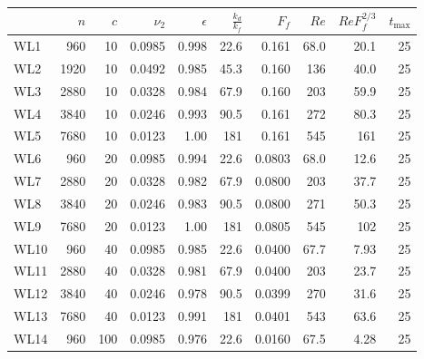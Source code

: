 \begin{table}
\begin{center}

\begin{tabular}{lrrrrrrrrr}
\toprule
{} &   $n$ &  $c$ &  $\nu_2$ &  $\epsilon$ &  $\frac{k_d}{k_f}$ &   $F_f$ &  $Re$ &  $ReF_f^{2/3}$ &  $t_{\max}$ \\
\midrule
WL1  &   960 &   10 &   0.0985 &       0.998 &                    22.6 &   0.161 &  68.0 &           20.1 &          25 \\
WL2  &  1920 &   10 &   0.0492 &       0.985 &                    45.3 &   0.160 &   136 &           40.0 &          25 \\
WL3  &  2880 &   10 &   0.0328 &       0.984 &                    67.9 &   0.160 &   203 &           59.9 &          25 \\
WL4  &  3840 &   10 &   0.0246 &       0.993 &                    90.5 &   0.161 &   272 &           80.3 &          25 \\
WL5  &  7680 &   10 &   0.0123 &        1.00 &                     181 &   0.161 &   545 &            161 &          25 \\
WL6  &   960 &   20 &   0.0985 &       0.994 &                    22.6 &  0.0803 &  68.0 &           12.6 &          25 \\
WL7  &  2880 &   20 &   0.0328 &       0.982 &                    67.9 &  0.0800 &   203 &           37.7 &          25 \\
WL8  &  3840 &   20 &   0.0246 &       0.983 &                    90.5 &  0.0800 &   271 &           50.3 &          25 \\
WL9  &  7680 &   20 &   0.0123 &        1.00 &                     181 &  0.0805 &   545 &            102 &          25 \\
WL10 &   960 &   40 &   0.0985 &       0.985 &                    22.6 &  0.0400 &  67.7 &           7.93 &          25 \\
WL11 &  2880 &   40 &   0.0328 &       0.981 &                    67.9 &  0.0400 &   203 &           23.7 &          25 \\
WL12 &  3840 &   40 &   0.0246 &       0.978 &                    90.5 &  0.0399 &   270 &           31.6 &          25 \\
WL13 &  7680 &   40 &   0.0123 &       0.991 &                     181 &  0.0401 &   543 &           63.6 &          25 \\
WL14 &   960 &  100 &   0.0985 &       0.976 &                    22.6 &  0.0160 &  67.5 &           4.28 &          25 \\

\end{tabular}
\end{center}
\end{table}
